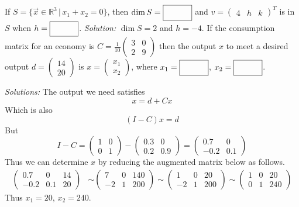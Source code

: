 \fi 
\ifnum {}
    If $S = \{\vec x \in \mathbb R^3 \, | \, x_1+x_2 = 0\}$, then $\dim S = \framebox{\strut\hspace{1cm}}$ and $v = \begin{pmatrix} 4&h&k\end{pmatrix}^T$ is in $S$ when $h = \framebox{\strut\hspace{1.0cm}}$. 
    \ifnum {} {\color{DarkBlue} \textit{Solution:} $\dim S = 2$ and $h = -4$.  } \fi    
\fi 
\ifnum {} If the consumption matrix for an economy is $C=\frac{1}{10}\begin{pmatrix} 3&0\\2&9\end{pmatrix}$ then the output $x$ to meet a desired output $d=\begin{pmatrix} 14\\20\end{pmatrix}$ is $x=\begin{pmatrix} x_1\\x_2 \end{pmatrix}$, where $x_1 = \framebox{\strut\hspace{1.0cm}}$, $x_2 = \framebox{\strut\hspace{1.0cm}}$.

\ifnum {} {\color{DarkBlue} \textit{Solutions:} 
The output we need satisfies 
$$x = d + Cx$$
Which is also
$$(I-C)x = d$$
But 
$$I-C = \begin{pmatrix} 1&0\\0&1\end{pmatrix} - \begin{pmatrix} 0.3 & 0 \\ 0.2 & 0.9 \end{pmatrix} = \begin{pmatrix} 0.7 & 0 \\ -0.2 & 0.1 \end{pmatrix}$$
Thus we can determine $x$ by reducing the augmented matrix below as follows. 
\begin{align}
    \begin{pmatrix} 0.7 & 0 & 14\\ -0.2 &  0.1 & 20\end{pmatrix} 
    & \sim \begin{pmatrix} 7 & 0 & 140\\ -2 & 1 & 200\end{pmatrix} 
     \sim \begin{pmatrix} 1 & 0 & 20\\ -2 & 1 & 200\end{pmatrix} 
     \sim \begin{pmatrix} 1 & 0 & 20\\ 0 & 1 & 240\end{pmatrix} 
\end{align}
Thus $x_1 = 20$, $x_2 = 240$. 
} 
\fi        
\fi 

